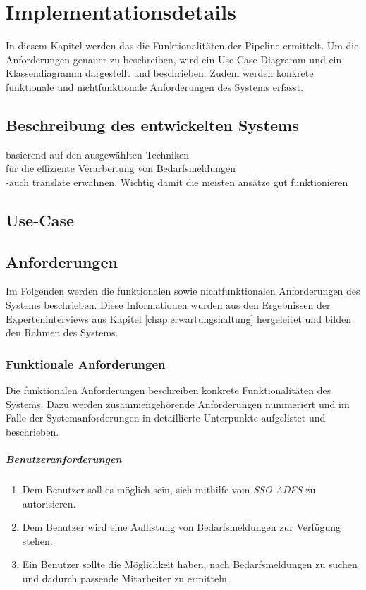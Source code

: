 \chapter{Implementationsdetails}
\label{chap:implementierung}
In diesem Kapitel werden das die Funktionalitäten der Pipeline ermittelt. Um die Anforderungen genauer zu beschreiben, wird ein Use-Case-Diagramm und ein Klassendiagramm dargestellt und beschrieben. Zudem werden konkrete funktionale und nichtfunktionale Anforderungen des Systems erfasst.
\section{Beschreibung des entwickelten Systems}
basierend auf den ausgewählten Techniken\\
für die effiziente Verarbeitung von Bedarfsmeldungen\\

-auch translate erwähnen. Wichtig damit die meisten ansätze gut funktionieren
\newpage
\section{Use-Case}
\newpage
\section{Anforderungen}
Im Folgenden werden die funktionalen sowie nichtfunktionalen Anforderungen des Systems beschrieben. Diese Informationen wurden aus den Ergebnissen der Experteninterviews aus Kapitel \ref{chap:erwartungshaltung} hergeleitet und bilden den Rahmen des Systems.
\subsection{Funktionale Anforderungen}
Die funktionalen Anforderungen beschreiben konkrete Funktionalitäten des Systems. Dazu werden zusammengehörende Anforderungen nummeriert und im Falle der Systemanforderungen in detaillierte Unterpunkte aufgelistet und beschrieben.
\paragraph{Benutzeranforderungen}
\begin{enumerate}
	\item Dem Benutzer soll es möglich sein, sich mithilfe vom \emph{SSO ADFS} zu autorisieren.
	\item Dem Benutzer wird eine Auflistung von Bedarfsmeldungen zur Verfügung stehen.
	\item Ein Benutzer sollte die Möglichkeit haben, nach Bedarfsmeldungen zu suchen und dadurch passende Mitarbeiter zu ermitteln.
\end{enumerate}
